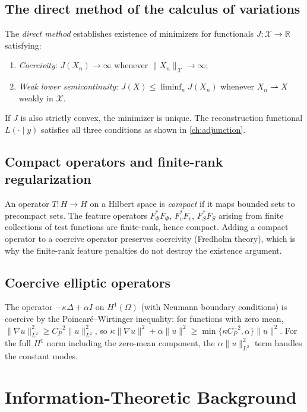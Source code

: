\documentclass[12pt, oneside]{memoir}
\newcommand{\X}{\mathcal{X}}
\newcommand{\nnorm}[1]{\lVert #1 \rVert}
\begin{document}
\section{The direct method of the calculus of variations}

The \emph{direct method} establishes existence of minimizers for functionals $J: \X \to
\mathbb{R}$ satisfying:
\begin{enumerate}
  \item \textit{Coercivity}: $J(X_n) \to \infty$ whenever $\nnorm{X_n}_\X \to \infty$;
  \item \textit{Weak lower semicontinuity}: $J(X) \le \liminf_n J(X_n)$ whenever
        $X_n \rightharpoonup X$ weakly in $\X$.
\end{enumerate}
If $J$ is also strictly convex, the minimizer is unique.  The reconstruction functional
$L(\cdot \mid y)$ satisfies all three conditions as shown in \cref{ch:adjunction}.

\section{Compact operators and finite-rank regularization}

An operator $T: H \to H$ on a Hilbert space is \emph{compact} if it maps bounded sets
to precompact sets.  The feature operators $F_\Phi^* F_\Phi$, $F_v^* F_v$, $F_S^* F_S$
arising from finite collections of test functions are finite-rank, hence compact.  Adding
a compact operator to a coercive operator preserves coercivity (Fredholm theory), which
is why the finite-rank feature penalties do not destroy the existence argument.

\section{Coercive elliptic operators}

The operator $-\kappa\Delta + \alpha I$ on $H^1(\Omega)$ (with Neumann boundary
conditions) is coercive by the Poincaré--Wirtinger inequality: for functions with zero
mean, $\nnorm{\nabla u}_{L^2}^2 \ge C_P^{-2} \nnorm{u}_{L^2}^2$, so $\kappa
\nnorm{\nabla u}^2 + \alpha \nnorm{u}^2 \ge \min\{\kappa C_P^{-2}, \alpha\} \nnorm{u}^2$.
For the full $H^1$ norm including the zero-mean component, the $\alpha \nnorm{u}_{L^2}^2$
term handles the constant modes.

\chapter{Information-Theoretic Background}
\label{app:info}
\end{document}
